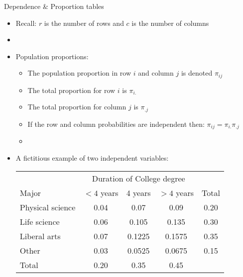 \documentclass[xcolor=dvipsnames]{beamer}
\begin{document}
\begin{frame}{Dependence \& Proportion tables}
\begin{itemize}
	\item Recall: $r$ is the number of rows and $c$ is the number of columns
		\item[]
	\item Population proportions:
	\begin{itemize}
		\item The population proportion in row $i$ and column $j$ is denoted $\pi_{ij}$
		\item The total proportion for row $i$ is $\pi_{i.}$
		\item The total proportion for column $j$ is $\pi_{.j}$
		\item If the row and column probabilities are independent then: $\pi_{ij}=\pi_{i.}\pi_{.j}$
		\item[]
	\end{itemize}
	\item A fictitious example of two independent variables:
	\begin{center}
		\begin{tabular}{|l|ccc|c|}
			\hline
			& \multicolumn{3}{c|}{Duration of College degree} & \\
			Major & $<4$ years & 4 years & $>4$ years & Total \\ \hline
			Physical science & 0.04 & 0.07 & 0.09 & 0.20 \\ 
			Life science & 0.06 & 0.105 & 0.135 & 0.30 \\
			Liberal arts & 0.07 & 0.1225 & 0.1575 & 0.35\\ 
			Other & 0.03 & 0.0525 & 0.0675 & 0.15 \\ \hline
			Total & 0.20 & 0.35 & 0.45 & \\ \hline
		\end{tabular}
	\end{center}
\end{itemize}
\end{frame}
\end{document}
